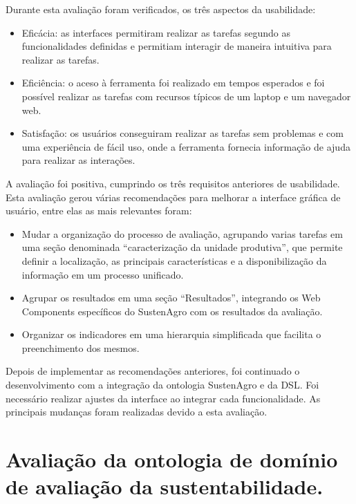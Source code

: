 Durante esta avaliação foram verificados, os três aspectos da usabilidade:
\begin{itemize}
\item Eficácia: as interfaces permitiram realizar as tarefas segundo as
funcionalidades definidas e permitiam interagir de maneira intuitiva
para realizar as tarefas.
\item Eficiência: o aceso à ferramenta foi realizado em tempos esperados
e foi possível realizar as tarefas com recursos típicos de um laptop
e um navegador web.
\item Satisfação: os usuários conseguiram realizar as tarefas sem problemas
e com uma experiência de fácil uso, onde a ferramenta fornecia informação
de ajuda para realizar as interações.
\end{itemize}
A avaliação foi positiva, cumprindo os três requisitos anteriores
de usabilidade. Esta avaliação gerou várias recomendações para melhorar
a interface gráfica de usuário, entre elas as mais relevantes foram: 
\begin{itemize}
\item Mudar a organização do processo de avaliação, agrupando varias tarefas
em uma seção denominada ``caracterização da unidade produtiva'',
que permite definir a localização, as principais características e
a disponibilização da informação em um processo unificado. 
\item Agrupar os resultados em uma seção ``Resultados'', integrando os
\foreignlanguage{english}{Web Components} específicos do SustenAgro
com os resultados da avaliação.
\item Organizar os indicadores em uma hierarquia simplificada que facilita
o preenchimento dos mesmos.
\end{itemize}
Depois de implementar as recomendações anteriores, foi continuado
o desenvolvimento com a integração da ontologia SustenAgro e da DSL.
Foi necessário realizar ajustes da interface ao integrar cada funcionalidade.
As principais mudanças foram realizadas devido a esta avaliação.

\section{Avaliação da ontologia de domínio de avaliação da sustentabilidade.}

